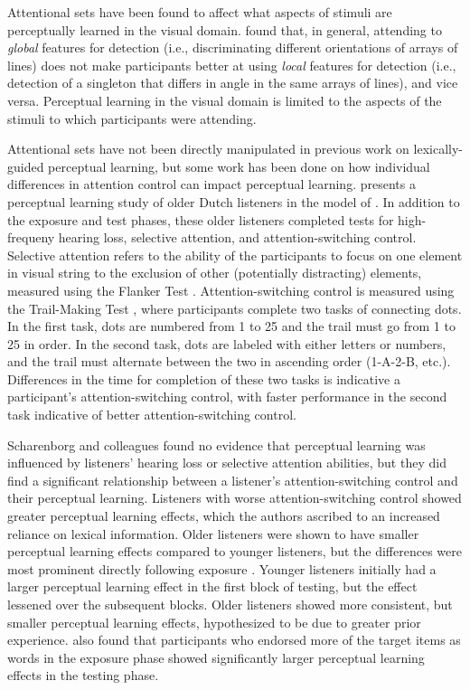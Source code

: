 Attentional sets have been found to affect what aspects of stimuli are perceptually learned in the visual domain.
\citet{Ahissar1993} found that, in general, attending to \emph{global} features for detection (i.e., discriminating different orientations of arrays of lines) does not make participants better at using \emph{local} features for detection (i.e., detection of a singleton that differs in angle in the same arrays of lines), and vice versa.  
Perceptual learning in the visual domain is limited to the aspects of the stimuli to which participants were attending.  

Attentional sets have not been directly manipulated in previous work on lexically-guided perceptual learning, but some work has been done on how individual differences in attention control can impact perceptual learning.
\citet{Scharenborg2014} presents a perceptual learning study of older Dutch listeners in the model of \citet{Norris2003}.  
In addition to the exposure and test phases, these older listeners completed tests for high-frequeny hearing loss, selective attention, and attention-switching control.
Selective attention refers to the ability of the participants to focus on one element in visual string to the exclusion of other (potentially distracting) elements, measured using the Flanker Test \citep{Eriksen1974}.
Attention-switching control  is measured using the Trail-Making Test \citep{Reitan1958}, where participants complete two tasks of connecting dots.
In the first task, dots are numbered from 1 to 25 and the trail must go from 1 to 25 in order.
In the second task, dots are labeled with either letters or numbers, and the trail must alternate between the two in ascending order (1-A-2-B, etc.).
Differences in the time for completion of these two tasks is indicative a participant's attention-switching control, with faster performance in the second task indicative of better attention-switching control.

Scharenborg and colleagues found no evidence that perceptual learning was influenced by listeners' hearing loss or selective attention abilities, but they did find a significant relationship between a listener's attention-switching control and their perceptual learning.  
Listeners with worse attention-switching control showed greater perceptual learning effects, which the authors ascribed to an increased reliance on lexical information.  
Older listeners were shown to have smaller perceptual learning effects compared to younger listeners, but the differences were most prominent directly following exposure \citep{Scharenborg2013}.  
Younger listeners initially had a larger perceptual learning effect in the first block of testing, but the effect lessened over the subsequent blocks.  
Older listeners showed more consistent, but smaller perceptual learning effects, hypothesized to be due to greater prior experience.  
\citet{Scharenborg2013} also found that participants who endorsed more of the target items as words in the exposure phase showed significantly larger perceptual learning effects in the testing phase.

